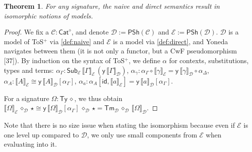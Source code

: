 \documentclass[10pt,a4paper]{amsart}
\newtheorem{theorem}{Theorem}
\newcommand{\Ty}{\mathsf{Ty}}
\newcommand{\Tm}{\mathsf{Tm}}
\newcommand{\Sub}{\mathsf{Sub}}
\newcommand{\id}{\mathsf{id}}
\newcommand{\C}{\mathcal{C}}
\newcommand{\D}{\mathcal{D}}
\newcommand{\E}{\mathcal{E}}
\newcommand{\PSh}{\mathsf{PSh}}
\newcommand{\y}{\mathsf{y}}
\begin{document}
\setcounter{theorem}{21}
\begin{theorem}\label{thm:naive_direct}
  For any signature, the naive and direct semantics result in
  isomorphic notions of models.
\end{theorem}

\setcounter{theorem}{21}
\begin{proof}
  We fix a $\C:\mathsf{Cat}^\diamond$, and denote $\D := \PSh(\C)$ and
  $\E := \PSh(\D)$. $\D$ is a model of ToS$^+$
  via \autoref{def:naive} and $\E$ is a model via
  \autoref{def:direct}, and Yoneda navigates between them (it is not
  only a functor, but a CwF pseudomorphism
  [37]). By induction on the syntax of ToS$^+$, we define $\alpha$ for contexts,
  substitutions, types and terms: 
  $\alpha_\Gamma : \Sub_{\E}\,\llbracket\Gamma\rrbracket_\E\,(\y\,\llbracket\Gamma\rrbracket_\D)$,
  $\alpha_\gamma : \alpha_\Gamma\circ\llbracket\gamma\rrbracket_\E = \y\,\llbracket\gamma\rrbracket_\D\circ\alpha_\Delta$,
  $\alpha_A : \llbracket A\rrbracket_\E \cong \y\,\llbracket A\rrbracket_\D[\alpha_\Gamma]$,
  $\alpha_a : \alpha_A[\id,\llbracket a\rrbracket_\E] = \y\,\llbracket a\rrbracket_\D[\alpha_\Gamma]$.
  




  For a signature $\Omega:\Ty\,\diamond$, we thus obtain $\llbracket\Omega\rrbracket_\E\,\diamond_\D\,{\star} \cong \y\,\llbracket\Omega\rrbracket_\D[\alpha_\Gamma]\,\diamond_\D\,{\star} = \Tm_\D\,\diamond_\D\,\llbracket\Omega\rrbracket_\D$.
\end{proof}
Note that there is no size issue when stating the isomorphism because
even if $\E$ is one level up compared to $\D$, we only use small
components from $\E$ when evaluating into it.
\end{document}
